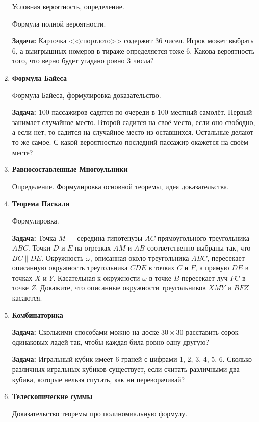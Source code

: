 \documentclass{article}
\begin{document}
\begin{enumerate}[label*=\protect\fbox{\arabic{enumi}}]
Условная вероятность, определение.

Формула полной вероятности.

\textbf{Задача:} Карточка <<спортлото>> содержит 36 чисел. Игрок может выбрать 6, а выигрышных номеров в тираже определяется тоже 6. Какова вероятность того, что верно будет угадано ровно 3 числа?

\item \textbf{Формула Байеса}			

Формула Байеса, формулировка доказательство.

\textbf{Задача:} 100 пассажиров садятся по очереди в 100-местный самолёт. Первый занимает случайное место. Второй садится на своё место, если оно свободно, а если нет, то садится на случайное место из оставшихся. Остальные делают то же самое. С какой вероятностью последний пассажир окажется на своём месте?


\item \textbf{Равносоставленные Многоульники}

Определение. Формулировка основной теоремы, идея доказательства.

\item \textbf{Теорема Паскаля}

Формулировка.

\textbf{Задача:} Точка $M$ — середина гипотенузы $AC$ прямоугольного треугольника $ABC$. Точки $D$ и $E$ на отрезках $AM$ и $AB$ соответственно выбраны так, что $BC \parallel DE$. Окружность $\omega$, описанная около треугольника $ABC$, пересекает описанную окружность треугольника $CDE$ в точках $C$ и $F$, а прямую $DE$ в точках $X$ и $Y$. Касательная к окружности $\omega$ в точке $B$ пересекает луч $FC$ в точке $Z$. Докажите, что описанные окружности треугольников $XMY$ и $BFZ$ касаются.

\item \textbf{Комбинаторика}		

\textbf{Задача:}  Сколькими способами можно на доске $30 \times 30$ расставить сорок одинаковых ладей так, чтобы каждая била ровно одну другую?

\textbf{Задача:} Игральный кубик имеет 6 граней с цифрами 1, 2, 3, 4, 5, 6. Сколько различных игральных кубиков существует, если считать различными два кубика, которые нельзя спутать, как ни переворачивай?

\item \textbf{Телескопические суммы}

Доказательство теоремы про полиномиальную формулу.


\end{enumerate}
\end{document}
